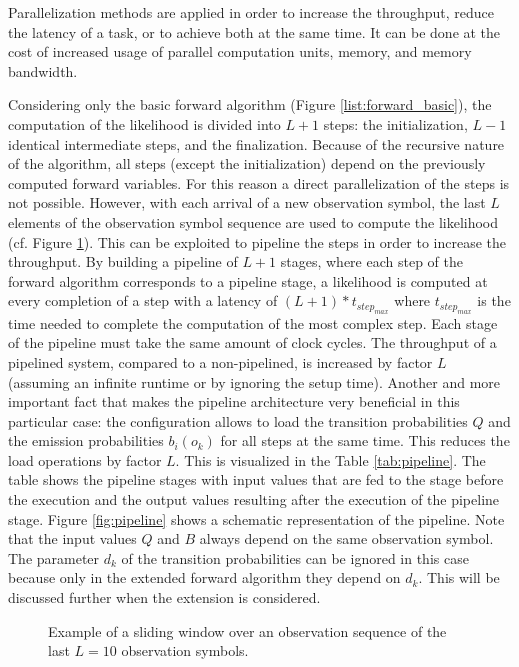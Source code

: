 \documentclass[mscthesis]{usiinfthesis}
\begin{document}
Parallelization methods are applied in order to increase the throughput,
reduce the latency of a task, or to achieve both at the same time. It can be
done at the cost of increased usage of parallel computation units, memory, and
memory bandwidth.

Considering only the basic forward algorithm (Figure
\ref{list:forward_basic}), the computation of the likelihood is divided into
$L+1$ steps: the initialization, $L-1$ identical intermediate steps, and the
finalization. Because of the recursive nature of the algorithm, all steps
(except the initialization) depend on the previously computed forward
variables. For this reason a direct parallelization of the steps is not
possible. However, with each arrival of a new observation symbol, the last $L$
elements of the observation symbol sequence are used to compute the likelihood
(cf. Figure \ref{fig:sliding}). This can be exploited to pipeline the steps in
order to increase the throughput. By building a pipeline of $L+1$ stages, where
each step of the forward algorithm corresponds to a pipeline stage,
a likelihood is computed at every completion of a step with a latency of
$(L+1)*t_{step_{max}}$ where $t_{step_{max}}$ is the time needed to complete
the computation of the most complex step. Each stage of the pipeline must take
the same amount of clock cycles. The throughput of a pipelined system, compared to
a non-pipelined, is increased by factor $L$ (assuming an infinite runtime
or by ignoring the setup time). Another and more important fact that makes the
pipeline architecture very beneficial in this particular case: the
configuration allows to load the transition probabilities $Q$ and the emission
probabilities $b_i(o_k)$ for all steps at the same time. This reduces the load
operations by factor $L$. This is visualized in the Table \ref{tab:pipeline}.
The table shows the pipeline stages with input values that are fed to the stage
before the execution and the output values resulting after the execution of
the pipeline stage. Figure \ref{fig:pipeline} shows a schematic representation
of the pipeline. Note that the input values $Q$ and $B$ always depend on
the same observation symbol. The parameter $d_k$ of the transition
probabilities can be ignored in this case because only in the extended forward
algorithm they depend on $d_k$. This will be discussed further when the
extension is considered.

\begin{figure}
    \centering
    
    \caption{Example of a sliding window over an observation sequence of the
        last $L=10$ observation symbols.}
    \label{fig:sliding}
\end{figure}
\end{document}
